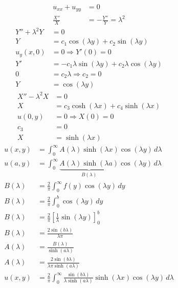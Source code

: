 \documentclass[../../HW08.tex]{subfiles}
\begin{document}
\begin{align*}
    u_{xx}+u_{yy} & = 0                            \\
    \frac{X''}{X} & = -\frac{Y''}{Y} = \lambda^{2}
\end{align*}
\begin{align*}
    Y'' + \lambda^{2}Y & = 0                                                          \\
    Y                  & = c_{1}\cos(\lambda y) + c_{2}\sin(\lambda y)                \\
    u_{y}(x,0)         & = 0 \Rightarrow Y'(0) = 0                                    \\
    Y'                 & = -c_{1}\lambda\sin(\lambda y) + c_{2}\lambda\cos(\lambda y) \\
    0                  & = c_{2}\lambda \Rightarrow c_{2} = 0                         \\
    Y                  & = \cos(\lambda y)
\end{align*}
\begin{align*}
    X'' - \lambda^{2}X & = 0                                             \\
    X                  & = c_{3}\cosh(\lambda x) + c_{4}\sinh(\lambda x) \\
    u(0,y)             & = 0 \Rightarrow X(0) = 0                        \\
    c_{3}              & = 0                                             \\
    X                  & = \sinh(\lambda x)
\end{align*}
\begin{align*}
    u(x,y)     & = \int_{0}^{\infty}A(\lambda)\sinh(\lambda x)\cos(\lambda y)\,d\lambda                                                     \\
    u(a,y)     & = \int_{0}^{\infty}\underbrace{A(\lambda)\sinh(\lambda a)}_{B(\lambda)} \cos(\lambda y)\,d\lambda                          \\
    B(\lambda) & = \frac{2}{\pi} \int_{0}^{\infty} f(y)\cos(\lambda y)\,dy                                                                  \\
    B(\lambda) & = \frac{2}{\pi} \int_{0}^{b} \cos(\lambda y)\,dy                                                                           \\
    B(\lambda) & = \frac{2}{\pi} \left[ \frac{1}{\lambda}\sin(\lambda y) \right]_{0}^{b}                                                    \\
    B(\lambda) & = \frac{2\sin(b\lambda)}{\lambda \pi}                                                                                      \\
    A(\lambda) & = \frac{B(\lambda)}{\sinh(a \lambda)}                                                                                      \\
    A(\lambda) & = \frac{2\sin(b \lambda)}{\lambda \pi \sinh(a\lambda)}                                                                     \\
    u(x,y)     & = \frac{2}{\pi} \int_{0}^{\infty} \frac{\sin(b\lambda)}{\lambda \sinh(a\lambda)} \sinh(\lambda x)\cos(\lambda y)\,d\lambda
\end{align*}
\end{document}
